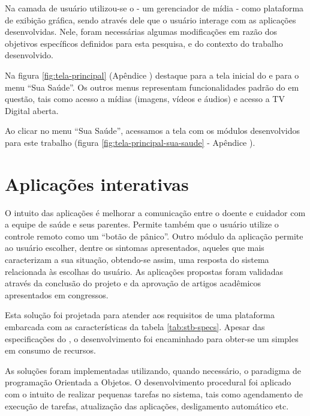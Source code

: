 
Na camada de usuário utilizou-se o \software[] \xbmc[] - um gerenciador de mídia
- como plataforma de exibição gráfica, sendo através dele que o usuário
interage com as aplicações desenvolvidas. Nele, foram necessárias algumas 
modificações em razão dos objetivos específicos definidos para esta pesquisa,
e do contexto do trabalho desenvolvido. 

Na figura \ref{fig:tela-principal} (Apêndice )
destaque para a tela inicial do \software[] \xbmc[] e para o menu ``Sua
Saúde''.  Os outros menus representam funcionalidades padrão do \software[] em
questão, tais como acesso a mídias (imagens, vídeos e áudios) e acesso a TV
Digital aberta.

Ao clicar no menu ``Sua Saúde'', acessamos a tela com os módulos desenvolvidos
para este trabalho (figura \ref{fig:tela-principal-sua-saude} - Apêndice 
).

\section{Aplicações interativas} \label{subsec:aplicacoes-tv-health}

O intuito das aplicações é melhorar a comunicação entre o doente e cuidador com
a equipe de saúde e seus parentes. Permite também que o usuário utilize o
controle remoto como um ``botão de pânico''. Outro módulo da
aplicação permite ao usuário escolher, dentre os sintomas apresentados, aqueles que mais
caracterizam a sua situação, obtendo-se assim, uma resposta do sistema relacionada às
escolhas do usuário. As aplicações  propostas foram validadas através da conclusão do
projeto \nextsaude[] e da aprovação de artigos acadêmicos apresentados em
congressos.

Esta solução foi projetada para atender aos requisitos de uma plataforma
embarcada com as características da tabela \ref{tab:stb-specs}. Apesar 
das especificações do \hardware[], o desenvolvimento foi encaminhado para 
obter-se um \software[] simples em consumo de recursos.

As soluções foram implementadas utilizando, quando necessário, o paradigma
de programação Orientada a Objetos. O desenvolvimento procedural foi aplicado
com o intuito de realizar pequenas tarefas no sistema, tais como agendamento
de execução de tarefas, atualização das aplicações, desligamento automático etc.

